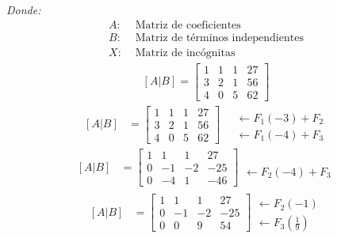 \documentclass[10pt, a4paper]{article}
\begin{document}
  \textit{Donde:}
  \begin{align*}
    A: &\text{ Matriz de coeficientes}\\
    B: &\text{ Matriz de términos independientes}\\
    X: &\text{ Matriz de incógnitas}
  \end{align*}
\begin{align*}
  \left[A|B\right] = \left[
    \begin{array}{ccc|c}
      1 & 1 & 1 & 27\\
      3 & 2 & 1 & 56\\
      4 & 0 & 5 & 62
    \end{array}
  \right]
\end{align*}
    \begin{align*}
    \left[A|B\right]&=\left[
      \begin{array}{ccc|c}
        1 & 1 & 1 & 27 \\[1.5ex]
        3 & 2 & 1 & 56 \\[1.5ex]
        4 & 0 & 5 & 62
      \end{array}
    \right]
    \quad
    \begin{array}{r}
      \\[1.5ex]
      \leftarrow F_1\left(-3\right)+F_2 \\[1.5ex]
      \leftarrow F_1\left(-4\right)+F_3
    \end{array}
  \end{align*}
  \begin{align*}
    \left[A|B\right]&=\left[
      \begin{array}{ccc|c}
        1 & 1 & 1 & 27 \\[1.5ex]
        0 & -1 & -2 & -25 \\[1.5ex]
        0 & -4 & 1 & -46
      \end{array}
    \right]
    \begin{array}{r}
      \\[1.5ex]\\[1.5ex]
      \leftarrow F_2\left(-4\right)+F_3 
    \end{array}
  \end{align*}
  \begin{align*}
    \left[A|B\right]&=\left[
      \begin{array}{ccc|c}
        1 & 1 & 1 & 27 \\[1.5ex]
        0 & -1 & -2 & -25 \\[1.5ex]
        0 & 0 & 9 & 54
      \end{array}
    \right]
    \begin{array}{r}
      \\[1.5ex]
      \leftarrow F_2\left(-1\right) \\[1.5ex]
      \leftarrow F_3\left(\frac{1}{9}\right)
    \end{array}
  \end{align*}
\end{document}
